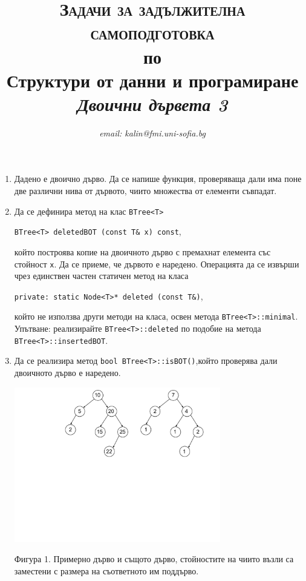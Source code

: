 \documentclass[12pt,a4paper]{article}
\author{\textit{email: kalin@fmi.uni-sofia.bg}}
\title{\textsc{Задачи за задължителна самоподготовка} \\
по \\
Структури от данни и програмиране\\
\textit{Двоични дървета 3}}
\begin{document}
\maketitle


\begin{enumerate}

	\item Дадено е двоично дърво. Да се напише функция, проверяваща дали има поне две различни нива от дървото, чиито множества от елементи съвпадат. 

	\item Да се дефинира метод на клас \texttt{BTree<T>}

	\texttt{BTree<T> deletedBOT (const T\& x) const},

	който построява копие на двоичното дърво с премахнат елемента със стойност \texttt{x}. Да се приеме, че дървото е наредено. Операцията да се извърши чрез единствен частен статичен метод на класа

	\texttt{private: static Node<T>* deleted (const T\&)},

	който не използва други методи на класа, освен метода \texttt{BTree<T>::minimal}. Упътване: реализирайте \texttt{BTree<T>::deleted} по подобие на метода \texttt{BTree<T>::insertedBOT}.

	\item Да се реализира метод \texttt{bool BTree<T>::isBOT()},който проверява дали двоичното дърво е наредено.


	\begin{flushleft}
	\includegraphics[width=9cm]{images/tree1}

	\vspace{-100px}

	Фигура 1. Примерно дърво и същото дърво, стойностите на чиито възли са заместени с размера на съответното им поддърво.
	\end{flushleft}



\end{enumerate}
\end{document}
